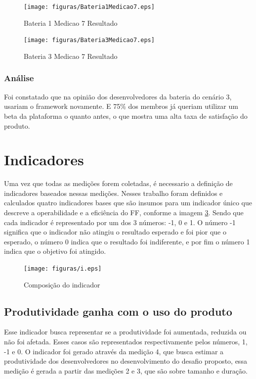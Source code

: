 \begin{figure}[H]
  \centering
  \label{fig:indicadores}
  \texttt{[image: figuras/Bateria1Medicao7.eps]}
  \caption{Bateria 1 Medicao 7 Resultado}
\end{figure}


\begin{figure}[H]
  \centering
  \label{fig:indicadores}
  \texttt{[image: figuras/Bateria3Medicao7.eps]}
  \caption{Bateria 3 Medicao 7 Resultado}
\end{figure}



\subsubsection{Análise}

Foi constatado que na opinião dos desenvolvedores da bateria do cenário 3, usariam o framework novamente. E
75\% dos membros já queriam utilizar um beta da plataforma o quanto antes, o que mostra uma alta taxa de satisfação
do produto.

\section{Indicadores}

Uma vez que todas as medições forem coletadas, é necessario a definição de indicadores baseados nessas medições.
Nesses trabalho foram definidos e calculados quatro indicadores bases que são insumos para um indicador único que descreve
a operabilidade e a eficiência do FF, conforme a imagem \ref{fig:indicadores}. Sendo que cada indicador é representado por
um dos 3 números: -1, 0 e 1. O número -1 significa que o indicador não atingiu o resultado esperado e foi pior que o esperado,
o número 0 indica que o resultado foi indiferente, e por fim o número 1 indica que o objetivo foi atingido.

\begin{figure}[H]
  \centering
  \label{fig:indicadores}
  \texttt{[image: figuras/i.eps]}
  \caption{Composição do indicador}
\end{figure}

\subsection{Produtividade ganha com o uso do produto}

Esse indicador busca representar se a produtividade foi aumentada, reduzida ou não foi afetada. Esses casos são representados
respectivamente pelos números, 1, -1 e 0. O indicador foi gerado através da medição 4, que busca estimar a produtividade
dos desenvolvedores no desenvolvimento do desafio proposto, essa medição é gerada a partir das medições 2 e 3, que
são sobre tamanho e duração.

